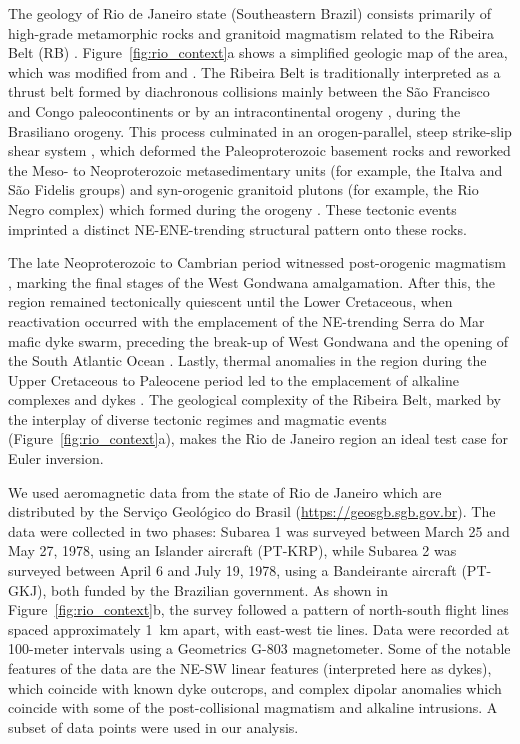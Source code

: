 The geology of Rio de Janeiro state (Southeastern Brazil) consists primarily of
high-grade metamorphic rocks and granitoid magmatism related to the Ribeira
Belt (RB) \citep{Heilbron2020}.
Figure~\ref{fig:rio_context}a shows a simplified geologic map of the area, which was modified from \citet{Heilbron2016} and \citet{Dantas2017}.
The Ribeira Belt is traditionally interpreted as a thrust
belt formed by diachronous collisions mainly between the São Francisco and
Congo paleocontinents \citep{Heilbron2008, Trouw2000} or by an intracontinental
orogeny \citep[\textit{e.g.}][]{Meira2015, Meira2019}, during the Brasiliano
orogeny. This process culminated in an orogen-parallel, steep strike-slip shear
system \citep{EgydioSilva2005}, which deformed the Paleoproterozoic basement
rocks and reworked the Meso- to Neoproterozoic metasedimentary units (for example, the
Italva and São Fidelis groups) and syn-orogenic granitoid plutons (for example, the Rio
Negro complex) which formed during the orogeny \citep{Heilbron2003, Heilbron2020}.
These tectonic events imprinted a distinct NE-ENE-trending structural pattern
onto these rocks.

The late Neoproterozoic to Cambrian period witnessed post-orogenic magmatism
\citep[\textit{e.g.,}][]{Valeriano2011}, marking the final stages of the West
Gondwana amalgamation. After this, the region remained tectonically quiescent
until the Lower Cretaceous, when reactivation occurred with the emplacement of
the NE-trending Serra do Mar mafic dyke swarm, preceding the break-up of West
Gondwana and the opening of the South Atlantic Ocean \citep{Almeida2013}.
Lastly, thermal anomalies in the region during the Upper Cretaceous to
Paleocene period led to the emplacement of alkaline complexes and dykes
\citep{Thompson1998}.
The geological complexity of the Ribeira Belt, marked by the interplay of diverse tectonic
regimes and magmatic events (Figure~\ref{fig:rio_context}a), makes the Rio de Janeiro
region an ideal test case for Euler inversion.

We used aeromagnetic data from the state of Rio de Janeiro which are distributed by the Serviço Geológico do Brasil (\url{https://geosgb.sgb.gov.br}).
The data were collected in two phases: Subarea 1 was surveyed between March 25 and May 27, 1978, using
an Islander aircraft (PT-KRP), while Subarea 2 was surveyed between April 6 and
July 19, 1978, using a Bandeirante aircraft (PT-GKJ), both funded by the
Brazilian government.
As shown in Figure~\ref{fig:rio_context}b, the survey followed a pattern of north-south flight lines spaced approximately \qty{1}{\km} apart, with east-west tie lines.
Data were recorded at 100-meter intervals using a Geometrics G-803 magnetometer.
Some of the notable features of the data are the NE-SW linear features (interpreted here as dykes), which coincide with known dyke outcrops, and complex dipolar anomalies which coincide with some of the post-collisional magmatism and alkaline intrusions.
A subset of \RioNData{} data points were used in our analysis.

